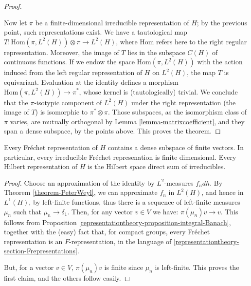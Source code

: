 \begin{proof}
\begin{itemize}
\end{itemize}

Now let $\pi$ be a finite-dimensional irreducible representation of $H$; by the previous point, such representations exist. We have a tautological map $T:\text{Hom}(\pi, L^2(H)) \otimes \pi\to L^2(H)$, where $\text{Hom}$ refers here to the right regular representation. Moreover, the image of $T$ lies in the subspace $C(H)$ of continuous functions. If we endow the space $\text{Hom}(\pi, L^2(H))$ with the action induced from the left regular representation of $H$ on $L^2(H)$, the map $T$ is equivariant. Evaluation at the identity defines a morphism $\text{Hom}(\pi, L^2(H)) \to \pi^*$, whose kernel is (tautologically) trivial. We conclude that the $\pi$-isotypic component of $L^2(H)$ under the right representation (the image of $T$) is isomorphic to $\pi^*\otimes \pi$. Those subspaces, as the isomorphism class of $\pi$ varies, are mutually orthogonal by Lemma \ref{lemma-matrixcoefficient}, and they span a dense subspace, by the points above. This proves the theorem.
\end{proof}


\begin{theorem}
\label{theorem-PeterWeyl-general}
 Every Fr\'echet representation of $H$ contains a dense subspace of finite vectors. In particular, every irreducible Fr\'echet represenation is finite dimensional. Every Hilbert representation of $H$ is the Hilbert space direct sum of irreducibles.
\end{theorem}


\begin{proof}

Choose an approximation of the identity by $L^2$-measures $f_ndh$. By Theorem \ref{theorem-PeterWeyl}, we can approximate $f_n$ in $L^2(H)$, and hence in $L^1(H)$, by left-finite functions, thus there is a sequence of left-finite measures $\mu_n$ such that $\mu_n\to \delta_1$. Then, for any vector $v\in V$ we have: $\pi(\mu_n)v\to v$. This follows from Proposition \ref{representationtheory-proposition-integral-Banach}, together with the (easy) fact that, for compact groups, every Fr\'echet representation is an $F$-representation, in the language of \ref{representationtheory-section-Frepresentations}.

But, for a vector $v\in V$, $\pi(\mu_n)v$ is finite since $\mu_n$ is left-finite. This proves the first claim, and the others follow easily.

\end{proof}




